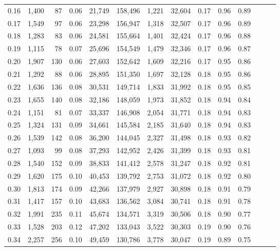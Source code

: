 \begin{tabular}{rrrrrrrrrrrrrr}
0.16 &  1,400 &   87 &  0.06 &   21,749 &  158,496 &   1,221 &  32,604 &  0.17 &  0.96 &      0.89 \\
0.17 &  1,549 &   97 &  0.06 &   23,298 &  156,947 &   1,318 &  32,507 &  0.17 &  0.96 &      0.89 \\
0.18 &  1,283 &   83 &  0.06 &   24,581 &  155,664 &   1,401 &  32,424 &  0.17 &  0.96 &      0.88 \\
0.19 &  1,115 &   78 &  0.07 &   25,696 &  154,549 &   1,479 &  32,346 &  0.17 &  0.96 &      0.87 \\
0.20 &  1,907 &  130 &  0.06 &   27,603 &  152,642 &   1,609 &  32,216 &  0.17 &  0.95 &      0.86 \\
0.21 &  1,292 &   88 &  0.06 &   28,895 &  151,350 &   1,697 &  32,128 &  0.18 &  0.95 &      0.86 \\
0.22 &  1,636 &  136 &  0.08 &   30,531 &  149,714 &   1,833 &  31,992 &  0.18 &  0.95 &      0.85 \\
0.23 &  1,655 &  140 &  0.08 &   32,186 &  148,059 &   1,973 &  31,852 &  0.18 &  0.94 &      0.84 \\
0.24 &  1,151 &   81 &  0.07 &   33,337 &  146,908 &   2,054 &  31,771 &  0.18 &  0.94 &      0.83 \\
0.25 &  1,324 &  131 &  0.09 &   34,661 &  145,584 &   2,185 &  31,640 &  0.18 &  0.94 &      0.83 \\
0.26 &  1,539 &  142 &  0.08 &   36,200 &  144,045 &   2,327 &  31,498 &  0.18 &  0.93 &      0.82 \\
0.27 &  1,093 &   99 &  0.08 &   37,293 &  142,952 &   2,426 &  31,399 &  0.18 &  0.93 &      0.81 \\
0.28 &  1,540 &  152 &  0.09 &   38,833 &  141,412 &   2,578 &  31,247 &  0.18 &  0.92 &      0.81 \\
0.29 &  1,620 &  175 &  0.10 &   40,453 &  139,792 &   2,753 &  31,072 &  0.18 &  0.92 &      0.80 \\
0.30 &  1,813 &  174 &  0.09 &   42,266 &  137,979 &   2,927 &  30,898 &  0.18 &  0.91 &      0.79 \\
0.31 &  1,417 &  157 &  0.10 &   43,683 &  136,562 &   3,084 &  30,741 &  0.18 &  0.91 &      0.78 \\
0.32 &  1,991 &  235 &  0.11 &   45,674 &  134,571 &   3,319 &  30,506 &  0.18 &  0.90 &      0.77 \\
0.33 &  1,528 &  203 &  0.12 &   47,202 &  133,043 &   3,522 &  30,303 &  0.19 &  0.90 &      0.76 \\
0.34 &  2,257 &  256 &  0.10 &   49,459 &  130,786 &   3,778 &  30,047 &  0.19 &  0.89 &      0.75 \\

\end{tabular}
